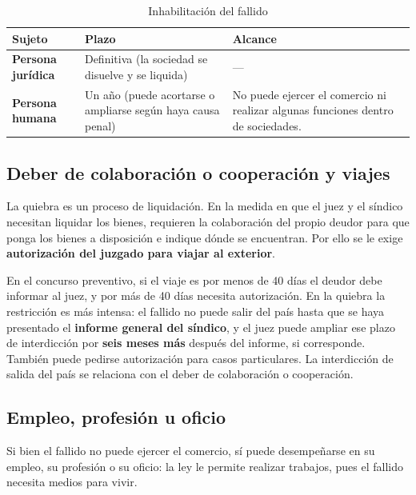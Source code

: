 \documentclass[12pt,oneside]{book}
\begin{document}
\begin{table}[H]
\centering
\small
\caption{Inhabilitación del fallido}
\begin{tabularx}{\textwidth}{>{\raggedright\arraybackslash}p{} >{\raggedright\arraybackslash}p{} Y}
\toprule
\textbf{Sujeto} & \textbf{Plazo} & \textbf{Alcance} \\
\midrule
\textbf{Persona jurídica} & Definitiva (la sociedad se disuelve y se liquida) & --- \\
\textbf{Persona humana} & Un año (puede acortarse o ampliarse según haya causa penal) & No puede ejercer el comercio ni realizar algunas funciones dentro de sociedades. \\
\bottomrule
\end{tabularx}
\end{table}

\subsection{Deber de colaboración o cooperación y viajes}

La quiebra es un proceso de liquidación. En la medida en que el juez y el síndico necesitan liquidar los bienes, requieren la colaboración del propio deudor para que ponga los bienes a disposición e indique dónde se encuentran. Por ello se le exige \textbf{autorización del juzgado para viajar al exterior}.

En el concurso preventivo, si el viaje es por menos de 40 días el deudor debe informar al juez, y por más de 40 días necesita autorización. En la quiebra la restricción es más intensa: el fallido no puede salir del país hasta que se haya presentado el \textbf{informe general del síndico}, y el juez puede ampliar ese plazo de interdicción por \textbf{seis meses más} después del informe, si corresponde. También puede pedirse autorización para casos particulares. La interdicción de salida del país se relaciona con el deber de colaboración o cooperación.

\subsection{Empleo, profesión u oficio}

Si bien el fallido no puede ejercer el comercio, sí puede desempeñarse en su empleo, su profesión o su oficio: la ley le permite realizar trabajos, pues el fallido necesita medios para vivir.
\end{document}
